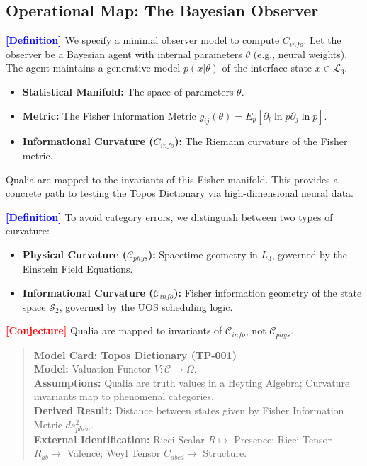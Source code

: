 \documentclass[11pt,titlepage]{article}
\newcommand{\interface}{\mathcal{L}_3}
\newcommand{\curvature}{\mathcal{C}}
\newcommand{\classifier}{\Omega}
\newcommand{\tagdef}{\textcolor{blue}{\textbf{[Definition]}} }
\newcommand{\tagconj}{\textcolor{red}{\textbf{[Conjecture]}} }
\begin{document}
\subsection{Operational Map: The Bayesian Observer}
\tagdef We specify a minimal observer model to compute $C_{info}$. Let the observer be a Bayesian agent with internal parameters $\theta$ (e.g., neural weights). The agent maintains a generative model $p(x | \theta)$ of the interface state $x \in \interface$.
\begin{itemize}
    
\item \textbf{Statistical Manifold:} The space of parameters $\theta$.
    
\item \textbf{Metric:} The Fisher Information Metric $g_{ij}(\theta) = E_p [\partial_i \ln p \partial_j \ln p]$.
    
\item \textbf{Informational Curvature ($C_{info}$):} The Riemann curvature of the Fisher metric.
\end{itemize}
Qualia are mapped to the invariants of this Fisher manifold. This provides a concrete path to testing the Topos Dictionary via high-dimensional neural data.

\tagdef To avoid category errors, we distinguish between two types of curvature:
\begin{itemize}
    
\item \textbf{Physical Curvature ($\curvature_{phys}$):} Spacetime geometry in $L_3$, governed by the Einstein Field Equations.
    
\item \textbf{Informational Curvature ($\curvature_{info}$):} Fisher information geometry of the state space $\mathcal{S}_2$, governed by the UOS scheduling logic.
\end{itemize}
\tagconj Qualia are mapped to invariants of $\curvature_{info}$, not $\curvature_{phys}$.

\begin{quote}
\textbf{Model Card: Topos Dictionary (TP-001)} \\
\textbf{Model:} Valuation Functor $V: \curvature \to \classifier$. \\
\textbf{Assumptions:} Qualia are truth values in a Heyting Algebra; Curvature invariants map to phenomenal categories. \\
\textbf{Derived Result:} Distance between states given by Fisher Information Metric $ds^2_{phen}$. \\
\textbf{External Identification:} Ricci Scalar $R \mapsto$ Presence; Ricci Tensor $R_{ab} \mapsto$ Valence; Weyl Tensor $C_{abcd} \mapsto$ Structure.
\end{quote}
\end{document}
